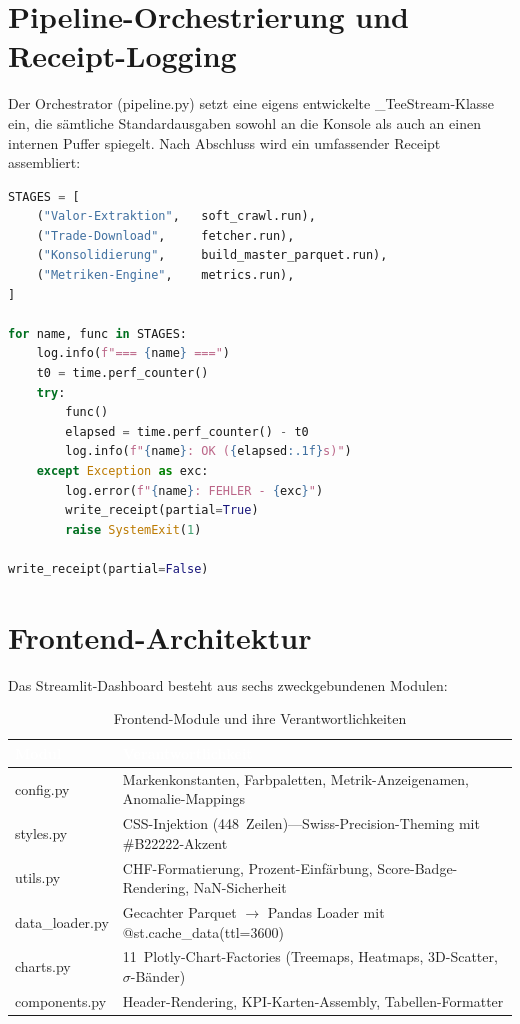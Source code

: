 \documentclass[11pt, a4paper, oneside, openany]{report}
\newcommand{\code}[1]{{\codefont\small\textcolor{DeepNavy}{#1}}}
\begin{document}
\section{Pipeline-Orchestrierung und Receipt-Logging}

Der Orchestrator (\code{pipeline.py}) setzt eine eigens entwickelte \code{\_TeeStream}-Klasse ein, die sämtliche Standardausgaben sowohl an die Konsole als auch an einen internen Puffer spiegelt. Nach Abschluss wird ein umfassender Receipt assembliert:

\begin{lstlisting}[language=Python, caption={Vereinfachtes Pipeline-Orchestrierungsmuster (\code{pipeline.py})}]
STAGES = [
    ("Valor-Extraktion",   soft_crawl.run),
    ("Trade-Download",     fetcher.run),
    ("Konsolidierung",     build_master_parquet.run),
    ("Metriken-Engine",    metrics.run),
]

for name, func in STAGES:
    log.info(f"=== {name} ===")
    t0 = time.perf_counter()
    try:
        func()
        elapsed = time.perf_counter() - t0
        log.info(f"{name}: OK ({elapsed:.1f}s)")
    except Exception as exc:
        log.error(f"{name}: FEHLER - {exc}")
        write_receipt(partial=True)
        raise SystemExit(1)

write_receipt(partial=False)
\end{lstlisting}

\section{Frontend-Architektur}

Das Streamlit-Dashboard besteht aus sechs zweckgebundenen Modulen:

\begin{table}[H]
\centering
\caption{Frontend-Module und ihre Verantwortlichkeiten}
\label{tab:frontend}
\sffamily\small
\begin{tabularx}{\textwidth}{>{\ttfamily}l X}
  \toprule
  \rowcolor{DeepNavy} \textcolor{white}{\textbf{Modul}} & \textcolor{white}{\textbf{Verantwortlichkeit}} \\
  \midrule
  config.py       & Markenkonstanten, Farbpaletten, Metrik-Anzeigenamen, Anomalie-Mappings \\
  styles.py       & CSS-Injektion (448~Zeilen)\;---\;Swiss-Precision-Theming mit \code{\#B22222}-Akzent \\
  utils.py        & CHF-Formatierung, Prozent-Einfärbung, Score-Badge-Rendering, NaN-Sicherheit \\
  data\_loader.py & Gecachter Parquet $\to$ Pandas Loader mit \code{@st.cache\_data(ttl=3600)} \\
  charts.py       & 11~Plotly-Chart-Factories (Treemaps, Heatmaps, 3D-Scatter, $\sigma$-Bänder) \\
  components.py   & Header-Rendering, KPI-Karten-Assembly, Tabellen-Formatter \\
  \bottomrule
\end{tabularx}
\end{table}
\end{document}
